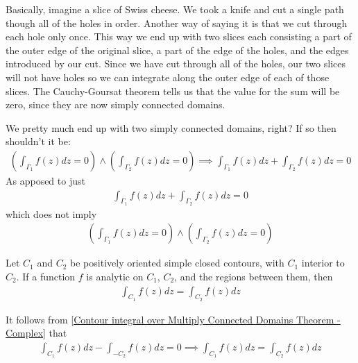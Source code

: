 \documentclass[12pt, english]{book}
\makeatletter
\renewenvironment{proof}[1][\proofname]{\par
	\pushQED{\qed}%
	\normalfont \topsep6\p@\@plus6\p@\relax
	\list{}{%
		\settowidth{\leftmargin}{\itshape\proofname:\hskip\labelsep}%
		\setlength{\labelwidth}{0pt}%
		\setlength{\itemindent}{-\leftmargin}%
		}%
	\item[\hskip\labelsep\itshape#1\@addpunct{:}]\ignorespaces
	}{\popQED\endlist\@endpefalse}
\makeatother
\begin{document}
	\begin{observation}
		Basically, imagine a slice of Swiss cheese. We took a knife and cut a single path though all of the holes in order. Another way of saying it is that we cut through each hole only once. This way we end up with two slices each consisting a part of the outer edge of the original slice, a part of the edge of the holes, and the edges introduced by our cut. Since we have cut through all of the holes, our two slices will not have holes so we can integrate along the outer edge of each of those slices. The Cauchy-Goursat theorem tells us that the value for the sum will be zero, since they are now simply connected domains. 
	\end{observation}
	
	\begin{question}
		We pretty much end up with two simply connected domains, right? If so then shouldn't it be:
		\begin{align*}
			\left( \int_{\Gamma_1} f(z) dz = 0 \right) \land \left( \int_{\Gamma_2} f(z) dz = 0 \right) \implies \int_{\Gamma_1} f(z) dz + \int_{\Gamma_2} f(z) dz = 0
		\end{align*}
		As apposed to just 
		\begin{align*}
			\int_{\Gamma_1} f(z) dz + \int_{\Gamma_2} f(z) dz = 0
		\end{align*}
		which does not imply
		\begin{align*}
			\left( \int_{\Gamma_1} f(z) dz = 0 \right) \land \left( \int_{\Gamma_2} f(z) dz = 0 \right)
		\end{align*}
	\end{question}

	\begin{corollary}
		\label{Principle of Deformation of Paths Corollary - Complex}
		Let \(C_1\) and \(C_2\) be positively oriented simple closed contours, with \(C_1\) interior to \(C_2\). If a function \(f\) is analytic on \(C_1\), \(C_2\), and the regions between them, then 
		\begin{align*}
			\int_{C_1} f(z) dz = \int_{C_2} f(z) dz
		\end{align*}
	\end{corollary}
	\begin{proof}
		It follows from \cref{Contour integral over Multiply Connected Domains Theorem - Complex} that 
		\begin{align*}
			\int_{C_1} f(z) dz - \int_{-C_2} f(z) dz = 0
			\implies \int_{C_1} f(z) dz = \int_{C_2} f(z) dz
		\end{align*}
	\end{proof}
\end{document}
